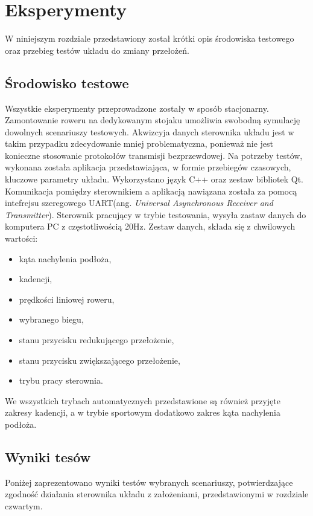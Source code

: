 \chapter{Eksperymenty}

W niniejszym rozdziale przedstawiony został krótki opis środowiska testowego oraz przebieg testów układu do zmiany przełożeń.

\section{Środowisko testowe}
Wszystkie eksperymenty przeprowadzone zostały w sposób stacjonarny. Zamontowanie roweru na dedykowanym stojaku umożliwia swobodną symulację dowolnych scenariuszy testowych. Akwizcyja danych sterownika układu jest w takim przypadku zdecydowanie mniej problematyczna, ponieważ nie jest konieczne stosowanie protokołów transmisji bezprzewdowej. 
Na potrzeby testów, wykonana została aplikacja przedstawiająca, w formie przebiegów czasowych, kluczowe parametry układu. Wykorzystano język C++ oraz zestaw bibliotek Qt. Komunikacja pomiędzy sterownikiem a aplikacją nawiązana została za pomocą intefrejsu szeregowego UART(ang. \textit{Universal Asynchronous Receiver and Transmitter}). Sterownik pracujący w trybie testowania, wysyła zastaw danych do komputera PC z częstotliwością 20Hz. Zestaw danych, składa się z chwilowych wartości:
\begin{itemize}
 \item
 kąta nachylenia podłoża,
 \item
 kadencji,
 \item
 prędkości liniowej roweru,
 \item
 wybranego biegu,
 \item
 stanu przycisku redukującego przełożenie,
 \item
 stanu przycisku zwiększającego przełożenie,
 \item
 trybu pracy sterownia.
 \end{itemize}
 
We wszystkich trybach automatycznych przedstawione są również przyjęte zakresy kadencji, a w trybie sportowym dodatkowo zakres kąta nachylenia podłoża.
 
\section{Wyniki tesów}

Poniżej zaprezentowano wyniki testów wybranych scenariuszy, potwierdzające zgodność działania sterownika układu z założeniami, przedstawionymi w rozdziale czwartym.

